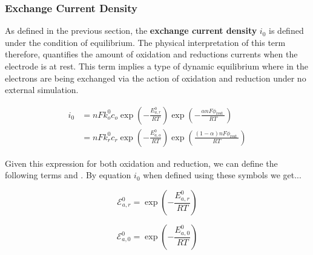 \documentclass[lettersize,journal]{IEEEtran}
\begin{document}
\subsubsection{Exchange Current Density}
As defined in the previous section, the \textbf{exchange current density}  $i_0$ is defined under the condition of equilibrium. The physical interpretation of this term therefore, quantifies the amount of oxidation and reductions currents when the electrode is at rest. This term implies a type of dynamic equilibrium where in the electrons are being exchanged via the action of oxidation and reduction under no external simulation.

\begin{equation}
\begin{aligned}
i_{0} &=n F k_{o}^{0} c_{o} \exp \left(-\frac{E_{a, r}^{0}}{R T}\right) \exp \left(-\frac{\alpha n F \phi_{\text {rest }}}{R T}\right) \\
&=n F k_{r}^{0} c_{r} \exp \left(-\frac{E_{a, o}^{0}}{R T}\right) \exp \left(\frac{(1-\alpha) n F \phi_{\text {rest }}}{R T}\right)
\end{aligned}
\end{equation}


\noindent Given this expression for both oxidation and reduction, we can define the following terms  and . By equation $i_0$ when defined using these symbols we get...

\begin{equation}
  \mathscr{E}_{a, r}^{0}=\exp \left(-\frac{E_{a, r}^{0}}{R T}\right)
\end{equation}

\begin{equation}
   \mathscr{E}_{a, 0}^{0}=\exp \left(-\frac{E_{a, 0}^{0}}{R T}\right)
\end{equation}

%
%
%
%
%
%
%
\end{document}

